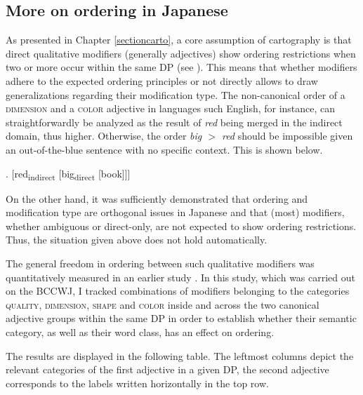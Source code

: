 \documentclass [output=book,colorlinks,citecolor=brown]{langscibook}
\begin{document}
\subsection{More on ordering in Japanese}

As presented in Chapter \ref{sectioncarto}, a core assumption of cartography is that direct qualitative modifiers (generally adjectives) show ordering restrictions when two or more occur within the same DP (see \citealt{scott:2002:stacked, cinque:2010:adj, laenzlinger:2011:elements}). This means that whether modifiers adhere to the expected ordering principles or not directly allows to draw generalizations regarding their modification type. The non-canonical order of a \textsc{dimension} and a \textsc{color} adjective in languages such English, for instance, can straightforwardly be analyzed as the result of \textit{red} being merged in the indirect domain, thus higher. Otherwise, the order \textit{big $>$ red} should be impossible given an out-of-the-blue sentence with no specific context. This is shown below. %

\ex. [red\textsubscript{indirect} [big\textsubscript{direct} [book]]]

On the other hand, it was sufficiently demonstrated that ordering and modification type are orthogonal issues in Japanese and that (most) modifiers, whether ambiguous or direct-only, are not expected to show ordering restrictions. Thus, the situation given above does not hold automatically.

The general freedom in ordering between such qualitative modifiers was quantitatively measured in an earlier study \citep{kohlich:2018:die}. In this study, which was carried out on the BCCWJ, I tracked combinations of modifiers belonging to the categories \textsc{quality}, \textsc{dimension}, \textsc{shape} and \textsc{color} inside and across the two canonical adjective groups within the same DP in order to establish whether their semantic category, as well as their word class, has an effect on ordering.

The results are displayed in the following table. The leftmost columns depict the relevant categories of the first adjective in a given DP, the second adjective corresponds to the labels written horizontally in the top row. %
\end{document}
